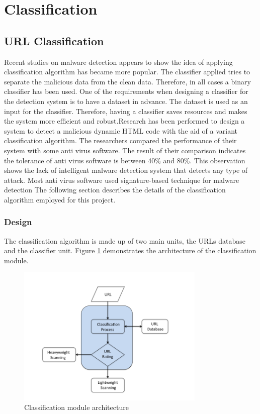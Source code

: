 \section{Classification}

\subsection{URL Classification}

Recent studies on malware detection appears to show the idea of applying classification algorithm has became more popular. The classifier applied tries to separate the malicious data from the clean data. Therefore, in all cases a binary classifier has been used. One of the requirements when designing a classifier for the detection system is to have a dataset in advance. The dataset is used as an input for the classifier. Therefore, having a classifier saves resources and makes the system more efficient and robust.Research has been performed to design a system to detect a malicious dynamic HTML code with the aid of a variant classification algorithm. The researchers compared the performance of their system with some anti virus software. The result of their comparison indicates the tolerance of anti virus software is between 40\% and 80\%. This observation shows the lack of intelligent malware detection system that detects any type of attack. Most anti virus software used signature-based technique for malware detection\cite{Macilious-weblearning}  
 The following section describes the details of the classification algorithm employed for this project. 
\subsubsection{Design}
The classification algorithm is made up of two main units, the URLs database and the classifier unit. Figure \ref{fig:clas-1} demonstrates the architecture of the classification module.

\begin{figure}[htb]
\centering
\includegraphics[width=0.8\textwidth]{img/classification(diag).png}
\caption{Classification module architecture}
\label{fig:clas-1}
\end{figure}


